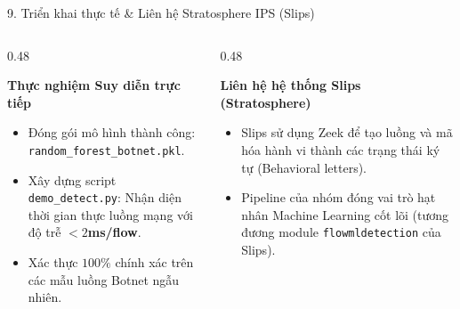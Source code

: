 \documentclass[lualatex,10pt,unknownkeysallowed]{beamer}
\begin{document}
\begin{frame}{9. Triển khai thực tế \& Liên hệ Stratosphere IPS (Slips)}
  \begin{columns}[T]
    \begin{column}{0.48\textwidth}
      \begin{block}{\textbf{Thực nghiệm Suy diễn trực tiếp}}
        \begin{itemize}
          \item Đóng gói mô hình thành công: \texttt{random\_forest\_botnet.pkl}.
          \item Xây dựng script \texttt{demo\_detect.py}: Nhận diện thời gian thực luồng mạng với độ trễ \textbf{$< 2$ms/flow}.
          \item Xác thực $100\%$ chính xác trên các mẫu luồng Botnet ngẫu nhiên.
        \end{itemize}
      \end{block}
    \end{column}
    \begin{column}{0.48\textwidth}
      \begin{block}{\textbf{Liên hệ hệ thống Slips (Stratosphere)}}
        \begin{itemize}
          \item Slips sử dụng Zeek để tạo luồng và mã hóa hành vi thành các trạng thái ký tự (Behavioral letters).
          \item Pipeline của nhóm đóng vai trò hạt nhân Machine Learning cốt lõi (tương đương module \texttt{flowmldetection} của Slips).
        \end{itemize}
      \end{block}
    \end{column}
  \end{columns}
\end{frame}
\end{document}

